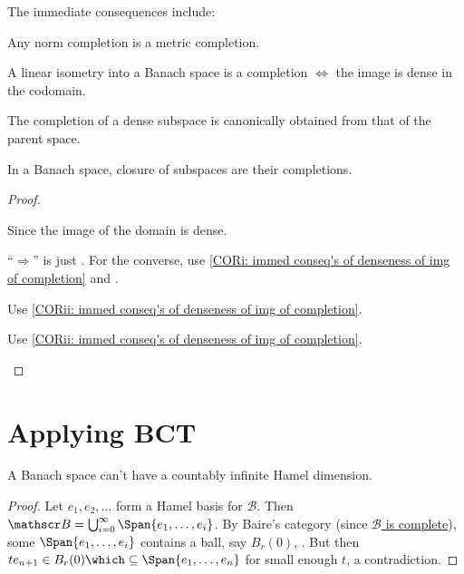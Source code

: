 	The immediate consequences include:
	
	\begin{cor}\label{COR: immed conseq's of denseness of img of completion}
		\begin{mylist}
			\item\label{CORi: immed conseq's of denseness of img of completion} Any norm completion is a metric completion.
			
			\item\label{CORii: immed conseq's of denseness of img of completion} A linear isometry into a Banach space is a completion $\iff$ the image is dense in the codomain.
			
			\item The completion of a dense subspace is canonically obtained from that of the parent space.
			
			\item In a Banach space, closure of subspaces are their completions.
		\end{mylist}
	\end{cor}
	
	\begin{proof}
		\begin{mylist}
			\item Since the image of the domain is dense.
			
			\item ``$\Rightarrow$'' is just . For the converse, use \ref{CORi: immed conseq's of denseness of img of completion} and .
			
			\item Use \ref{CORii: immed conseq's of denseness of img of completion}.
			
			\item Use \ref{CORii: immed conseq's of denseness of img of completion}.\qedhere
		\end{mylist}
	\end{proof}
	
	

\section{Applying BCT}
	
	\begin{prp}
		A Banach space can't have a countably infinite Hamel dimension.
	\end{prp}
	
	\begin{proof}
		Let $e_1, e_2, \ldots$ form a Hamel basis for $\mathscr B$. Then $\mathscr B = \bigcup_{i = 0}^\infty\Span\{e_1, \ldots, e_i\}$. By Baire's category (since \uline{$\mathscr B$ is complete}), some $\Span\{e_1, \ldots, e_i\}$ contains a ball, say $B_r(0)$, \wlogg. But then $te_{n + 1}\in B_r(0)\which\subseteq \Span\{e_1, \ldots, e_n\}$ for small enough $t$, a contradiction.
	\end{proof}
	

